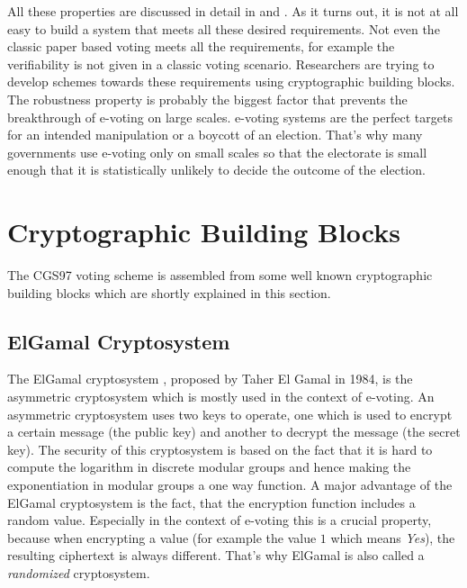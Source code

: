 \documentclass[numbers=noenddot, abstract=on, a4paper, headsepline,
footsepline, oneside, draft=off]{scrreprt}
\begin{document}
All these properties are discussed in detail in \cite{HS11} and \cite{Jonker09}.
As it turns out, it is not at all easy to build a system that meets all these
desired requirements. Not even the classic paper based voting meets all the
requirements, for example the verifiability is not given in a classic voting
scenario. Researchers are trying to develop schemes towards these requirements
using cryptographic building blocks. The robustness property is probably the
biggest factor that prevents the breakthrough of e-voting on large scales.
e-voting systems are the perfect targets for an intended manipulation or a
boycott of an election. That's why many governments use e-voting only on small
scales so that the electorate is small enough that it is statistically unlikely
to decide the outcome of the election.

\section{Cryptographic Building Blocks}
\label{sec:buildingblocks}
The CGS97 voting scheme is assembled from some well known cryptographic building
blocks which are shortly explained in this section.

\subsection{ElGamal Cryptosystem}
\label{sec:elgamal}
The ElGamal cryptosystem \cite{EG84}, proposed by Taher El Gamal in 1984, is the
asymmetric cryptosystem which is mostly used in the context of e-voting. An
asymmetric cryptosystem uses two keys to operate, one which is used to encrypt a
certain message (the public key) and another to decrypt the message (the secret
key). The security of this cryptosystem is based on the fact that it is hard to
compute the logarithm in discrete modular groups and hence making the
exponentiation in modular groups a one way function. A major advantage of the
ElGamal cryptosystem is the fact, that the encryption function includes a random
value. Especially in the context of e-voting this is a crucial property, because
when encrypting a value (for example the value $1$ which means \textit{Yes}),
the resulting ciphertext is always different. That's why ElGamal is also called
a \textit{randomized} cryptosystem.
\end{document}
